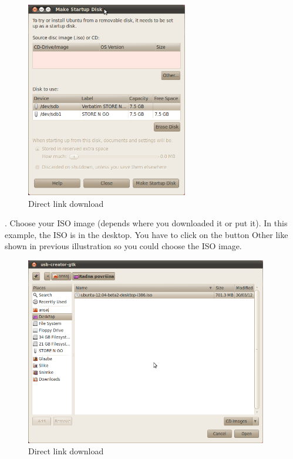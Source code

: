 \begin{figure}[h!]	
	\begin{center}
	\includegraphics[width=200pt]{./images/obtain-ubuntu/USB3.png}
	\caption{Direct link download}	
	\label{fig:usb3}	
	\end{center}
\end{figure}

\par {}. Choose your ISO image (depends where you downloaded it or put it). In this example, the ISO is in the desktop. You have to click on the button Other like shown in previous illustration  so you could choose the ISO image. \\

\begin{figure}[h!]	
	\begin{center}
	\includegraphics[width=300pt]{./images/obtain-ubuntu/USB4.png}
	\caption{Direct link download}	
	\label{fig:usb4}	
	\end{center}
\end{figure}

